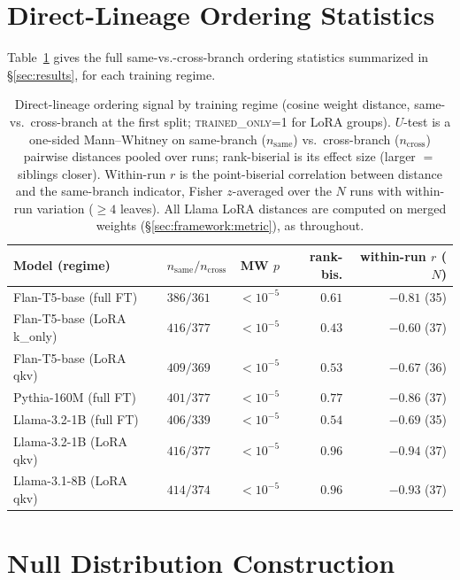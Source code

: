 \documentclass{article}
\theoremstyle{definition}
\theoremstyle{plain}
\begin{document}
\section{Direct-Lineage Ordering Statistics}
\label{app:direct}
Table~\ref{tab:direct} gives the full same-vs.-cross-branch ordering statistics summarized in
\S\ref{sec:results}, for each training regime.

\begin{table}[h]
\caption{Direct-lineage ordering signal by training regime (cosine weight distance, same-vs.\
  cross-branch at the first split; \textsc{trained\_only=1} for LoRA groups). $U$-test is a
  one-sided Mann--Whitney on same-branch ($n_{\text{same}}$) vs.\ cross-branch ($n_{\text{cross}}$)
  pairwise distances pooled over runs; rank-biserial is its effect size (larger $=$ siblings
  closer). Within-run $r$ is the point-biserial correlation between distance and the same-branch
  indicator, Fisher $z$-averaged over the $N$ runs with within-run variation ($\geq 4$ leaves).
  All Llama LoRA distances are computed on merged weights (\S\ref{sec:framework:metric}), as throughout.}
\label{tab:direct}
\begin{center}
\begin{tabular}{llrrr}
\toprule
Model (regime) & $n_{\text{same}}/n_{\text{cross}}$ & MW $p$ & rank-bis. & within-run $r$ ($N$) \\
\midrule
Flan-T5-base (full FT)      & $386/361$ & $<10^{-5}$  & $0.61$ & $-0.81$ (35) \\
Flan-T5-base (LoRA k\_only) & $416/377$ & $<10^{-5}$  & $0.43$ & $-0.60$ (37) \\
Flan-T5-base (LoRA qkv)     & $409/369$ & $<10^{-5}$  & $0.53$ & $-0.67$ (36) \\
Pythia-160M (full FT)       & $401/377$ & $<10^{-5}$  & $0.77$ & $-0.86$ (37) \\
Llama-3.2-1B (full FT)      & $406/339$ & $<10^{-5}$  & $0.54$ & $-0.69$ (35) \\
Llama-3.2-1B (LoRA qkv)     & $416/377$ & $<10^{-5}$ & $0.96$ & $-0.94$ (37) \\
Llama-3.1-8B (LoRA qkv)     & $414/374$ & $<10^{-5}$ & $0.96$ & $-0.93$ (37) \\
\bottomrule
\end{tabular}
\end{center}
\end{table}

\section{Null Distribution Construction}
\label{app:null}
\end{document}
